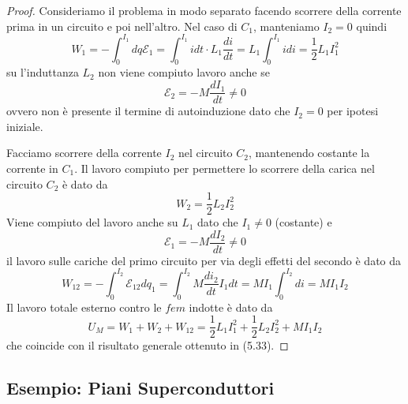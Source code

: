 \begin{proof}
	Consideriamo il problema in modo separato facendo scorrere della corrente prima in un circuito e poi nell'altro. Nel caso di $C_1$, manteniamo $I_2 = 0$ quindi
	\begin{equation*}
		W_1 = - \int_0^{I_1} dq \mathcal{E}_1 = \int_{0}^{I_1} idt \cdot L_1 \frac{di}{dt} = L_1 \int_{0}^{I_1} idi = \frac{1}{2}L_1I_1^2 
	\end{equation*}
su l'induttanza $L_2$ non viene compiuto lavoro anche se 
\begin{equation*}
	\mathcal{E}_2 = - M \frac{dI_1}{dt} \neq 0
\end{equation*}
ovvero non \`e presente il termine di autoinduzione dato che $I_2 =0$ per ipotesi iniziale.

Facciamo scorrere della corrente $I_2$ nel circuito $C_2$, mantenendo costante la corrente in $C_1$. Il lavoro compiuto per permettere lo scorrere della carica nel circuito $C_2$ \`e dato da
\begin{equation*}
	W_2 = \frac{1}{2}L_2 I_2^2
\end{equation*}
Viene compiuto del lavoro anche su $L_1$ dato che $I_1 \neq 0$ (costante) e 
\begin{equation*}
	\mathcal{E}_1 =  - M \frac{dI_2}{dt} \neq 0
\end{equation*}
il lavoro sulle cariche del primo circuito per via degli effetti del secondo \`e dato da
\begin{equation*}
	W_{12} = - \int_{0}^{I_2} \mathcal{E}_{12}dq_1 = \int_{0}^{I_2} M \frac{d i_2}{dt}I_1 dt = MI_1 \int _0^{I_2}di = M I_1 I_2
\end{equation*}
Il lavoro totale esterno contro le $fem$ indotte \`e dato da 
\begin{equation*}
	U_M = W_1 + W_2 + W_{12} = \frac{1}{2}L_1 I_1^2 + \frac{1}{2}L_2 I_2^2 + MI_1I_2
\end{equation*}
che coincide con il risultato generale ottenuto in (5.33).

\end{proof} 

\subsection{Esempio: Piani Superconduttori}

